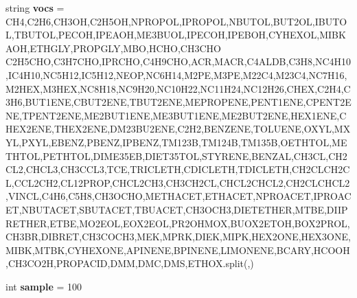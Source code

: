\begin{DoxyCompactItemize}
string {\bfseries vocs} = \textquotesingle{}C\+H4,C2\+H6,C\+H3\+OH,C2\+H5\+OH,N\+P\+R\+O\+P\+OL,I\+P\+R\+O\+P\+OL,N\+B\+U\+T\+OL,B\+U\+T2\+OL,I\+B\+U\+T\+OL,T\+B\+U\+T\+OL,P\+E\+C\+OH,I\+P\+E\+A\+OH,M\+E3\+B\+U\+OL,I\+P\+E\+C\+OH,I\+P\+E\+B\+OH,C\+Y\+H\+E\+X\+OL,M\+I\+B\+K\+A\+OH,E\+T\+H\+G\+LY,P\+R\+O\+P\+G\+LY,M\+BO,H\+C\+HO,C\+H3\+C\+HO C2\+H5\+C\+HO,C3\+H7\+C\+HO,I\+P\+R\+C\+HO,C4\+H9\+C\+HO,A\+CR,M\+A\+CR,C4\+A\+L\+DB,C3\+H8,N\+C4\+H10,I\+C4\+H10,N\+C5\+H12,I\+C5\+H12,N\+E\+OP,N\+C6\+H14,M2\+PE,M3\+PE,M22\+C4,M23\+C4,N\+C7\+H16,M2\+H\+EX,M3\+H\+EX,N\+C8\+H18,N\+C9\+H20,N\+C10\+H22,N\+C11\+H24,N\+C12\+H26,C\+H\+EX,C2\+H4,C3\+H6,B\+U\+T1\+E\+NE,C\+B\+U\+T2\+E\+NE,T\+B\+U\+T2\+E\+NE,M\+E\+P\+R\+O\+P\+E\+NE,P\+E\+N\+T1\+E\+NE,C\+P\+E\+N\+T2\+E\+NE,T\+P\+E\+N\+T2\+E\+NE,M\+E2\+B\+U\+T1\+E\+NE,M\+E3\+B\+U\+T1\+E\+NE,M\+E2\+B\+U\+T2\+E\+NE,H\+E\+X1\+E\+NE,C\+H\+E\+X2\+E\+NE,T\+H\+E\+X2\+E\+NE,D\+M23\+B\+U2\+E\+NE,C2\+H2,B\+E\+N\+Z\+E\+NE,T\+O\+L\+U\+E\+NE,O\+X\+YL,M\+X\+YL,P\+X\+YL,E\+B\+E\+NZ,P\+B\+E\+NZ,I\+P\+B\+E\+NZ,T\+M123B,T\+M124B,T\+M135B,O\+E\+T\+H\+T\+OL,M\+E\+T\+H\+T\+OL,P\+E\+T\+H\+T\+OL,D\+I\+M\+E35\+EB,D\+I\+E\+T35\+T\+OL,S\+T\+Y\+R\+E\+NE,B\+E\+N\+Z\+AL,C\+H3\+CL,C\+H2\+C\+L2,C\+H\+C\+L3,C\+H3\+C\+C\+L3,T\+CE,T\+R\+I\+C\+L\+E\+TH,C\+D\+I\+C\+L\+E\+TH,T\+D\+I\+C\+L\+E\+TH,C\+H2\+C\+L\+C\+H2\+CL,C\+C\+L2\+C\+H2,C\+L12\+P\+R\+OP,C\+H\+C\+L2\+C\+H3,C\+H3\+C\+H2\+CL,C\+H\+C\+L2\+C\+H\+C\+L2,C\+H2\+C\+L\+C\+H\+C\+L2,V\+I\+N\+CL,C4\+H6,C5\+H8,C\+H3\+O\+C\+HO,M\+E\+T\+H\+A\+C\+ET,E\+T\+H\+A\+C\+ET,N\+P\+R\+O\+A\+C\+ET,I\+P\+R\+O\+A\+C\+ET,N\+B\+U\+T\+A\+C\+ET,S\+B\+U\+T\+A\+C\+ET,T\+B\+U\+A\+C\+ET,C\+H3\+O\+C\+H3,D\+I\+E\+T\+E\+T\+H\+ER,M\+T\+BE,D\+I\+I\+P\+R\+E\+T\+H\+ER,E\+T\+BE,M\+O2\+E\+OL,E\+O\+X2\+E\+OL,P\+R2\+O\+H\+M\+OX,B\+U\+O\+X2\+E\+T\+OH,B\+O\+X2\+P\+R\+OL,C\+H3\+BR,D\+I\+B\+R\+ET,C\+H3\+C\+O\+C\+H3,M\+EK,M\+P\+RK,D\+I\+EK,M\+I\+PK,H\+E\+X2\+O\+NE,H\+E\+X3\+O\+NE,M\+I\+BK,M\+T\+BK,C\+Y\+H\+E\+X\+O\+NE,A\+P\+I\+N\+E\+NE,B\+P\+I\+N\+E\+NE,L\+I\+M\+O\+N\+E\+NE,B\+C\+A\+RY,H\+C\+O\+OH,C\+H3\+C\+O2H,P\+R\+O\+P\+A\+C\+ID,D\+MM,D\+MC,D\+MS,E\+T\+H\+OX\textquotesingle{}.split(\textquotesingle{},\textquotesingle{})
\item 
\mbox{\label{namespacedsmacc_1_1graph_1_1permutate_aeb25ff378e7bd978a83569cc3dcb0b9d}} 
int {\bfseries sample} = 100
\item 
\mbox{\label{namespacedsmacc_1_1graph_1_1permutate_a1bfd4565df3d092ab1a57faf35c3dc5b}} 

\end{DoxyCompactItemize}

